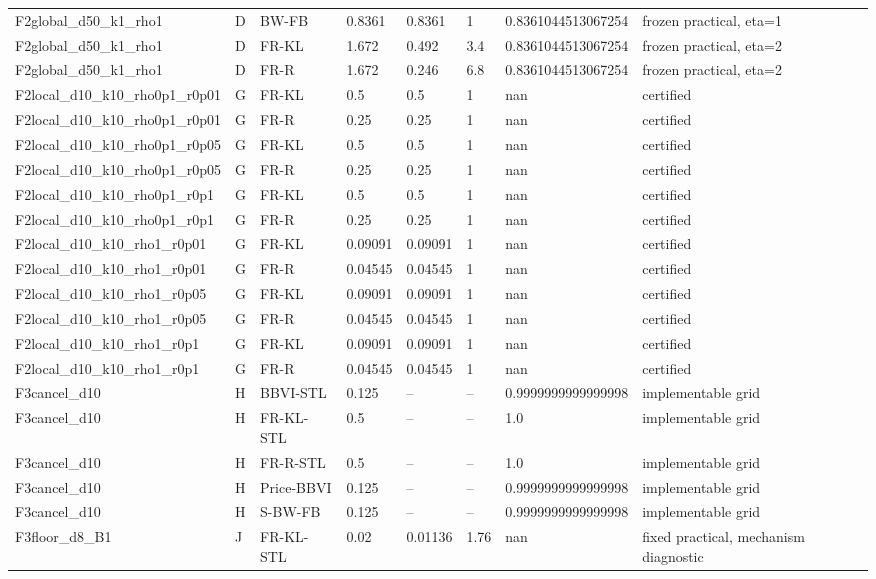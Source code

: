 \begin{tabular}{llllllll}
F2global\_d50\_k1\_rho1 & D & BW-FB & 0.8361 & 0.8361 & 1 & 0.8361044513067254 & frozen practical, eta=1 \\
F2global\_d50\_k1\_rho1 & D & FR-KL & 1.672 & 0.492 & 3.4 & 0.8361044513067254 & frozen practical, eta=2 \\
F2global\_d50\_k1\_rho1 & D & FR-R & 1.672 & 0.246 & 6.8 & 0.8361044513067254 & frozen practical, eta=2 \\
F2local\_d10\_k10\_rho0p1\_r0p01 & G & FR-KL & 0.5 & 0.5 & 1 & nan & certified \\
F2local\_d10\_k10\_rho0p1\_r0p01 & G & FR-R & 0.25 & 0.25 & 1 & nan & certified \\
F2local\_d10\_k10\_rho0p1\_r0p05 & G & FR-KL & 0.5 & 0.5 & 1 & nan & certified \\
F2local\_d10\_k10\_rho0p1\_r0p05 & G & FR-R & 0.25 & 0.25 & 1 & nan & certified \\
F2local\_d10\_k10\_rho0p1\_r0p1 & G & FR-KL & 0.5 & 0.5 & 1 & nan & certified \\
F2local\_d10\_k10\_rho0p1\_r0p1 & G & FR-R & 0.25 & 0.25 & 1 & nan & certified \\
F2local\_d10\_k10\_rho1\_r0p01 & G & FR-KL & 0.09091 & 0.09091 & 1 & nan & certified \\
F2local\_d10\_k10\_rho1\_r0p01 & G & FR-R & 0.04545 & 0.04545 & 1 & nan & certified \\
F2local\_d10\_k10\_rho1\_r0p05 & G & FR-KL & 0.09091 & 0.09091 & 1 & nan & certified \\
F2local\_d10\_k10\_rho1\_r0p05 & G & FR-R & 0.04545 & 0.04545 & 1 & nan & certified \\
F2local\_d10\_k10\_rho1\_r0p1 & G & FR-KL & 0.09091 & 0.09091 & 1 & nan & certified \\
F2local\_d10\_k10\_rho1\_r0p1 & G & FR-R & 0.04545 & 0.04545 & 1 & nan & certified \\
F3cancel\_d10 & H & BBVI-STL & 0.125 & -- & -- & 0.9999999999999998 & implementable grid \\
F3cancel\_d10 & H & FR-KL-STL & 0.5 & -- & -- & 1.0 & implementable grid \\
F3cancel\_d10 & H & FR-R-STL & 0.5 & -- & -- & 1.0 & implementable grid \\
F3cancel\_d10 & H & Price-BBVI & 0.125 & -- & -- & 0.9999999999999998 & implementable grid \\
F3cancel\_d10 & H & S-BW-FB & 0.125 & -- & -- & 0.9999999999999998 & implementable grid \\
F3floor\_d8\_B1 & J & FR-KL-STL & 0.02 & 0.01136 & 1.76 & nan & fixed practical, mechanism diagnostic \\

\end{tabular}
